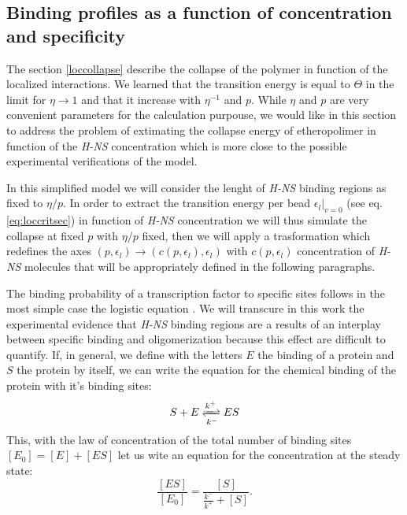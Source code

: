 \documentclass[12pt,a4paper,notitlepage]{article}
\newcommand{\hns}{\emph{H-NS}\xspace}
\begin{document}
\begin{appendices}
\section{Binding profiles as a function of concentration and specificity}
\label{logistic}
The section \ref{loccollapse} describe the collapse of the polymer in
function of the localized interactions. We learned that the transition
energy is equal to $\Theta$ in the limit for $\eta \to 1$ and that it
increase with $\eta^{-1}$ and $p$. While $\eta$ and $p$ are very
convenient parameters for the calculation purpouse, we would like in
this section to address the problem of extimating the collapse energy
of etheropolimer in function of the \hns concentration which is more
close to the possible experimental verifications of the model.

In this simplified model we will consider the lenght of \hns binding
regions as fixed to $\eta / p$. In order to extract the transition
energy per bead $\left. \epsilon_l \right|_{v = 0}$  (see
eq. \ref{eq:loccritsec}) in function of \hns concentration we will
thus simulate the collapse at fixed $p$ with $\eta / p$ fixed, then we
will apply a trasformation which redefines the axes 
$(p, \epsilon_l) \to (c(p,\epsilon_l), \epsilon_l)$ with $c(p,
\epsilon_l)$ concentration of \hns molecules that will be
appropriately defined in the following paragraphs.

The binding probability of a transcription factor to specific sites
follows in the most simple case the logistic equation
\cite{Ackers1982,Bintu2005}. We will transcure in this work the
experimental evidence that \hns binding regions are a results
of an interplay between specific binding and
oligomerization\cite{Gordon2011, Stella2005} because this effect are
difficult to quantify. If, in general, we define with the letters $E$
the binding of a protein and $S$ the protein by itself, we can write
the equation for the chemical binding of the protein with it's binding
sites:
\begin{equation}
S + E \xrightleftharpoons[k^{-}]{k^{+}} ES
\end{equation}
This, with the law of concentration of the total number of binding
sites $[E_0] = [E] + [ES]$ let us wite an equation for the
concentration at the steady state:
\begin{equation}
\frac{[ES]}{[E_0]} = \frac{[S]}{\frac{k^{-}}{k^{+}} + [S]}.
\end{equation}


\end{appendices}
\end{document}
